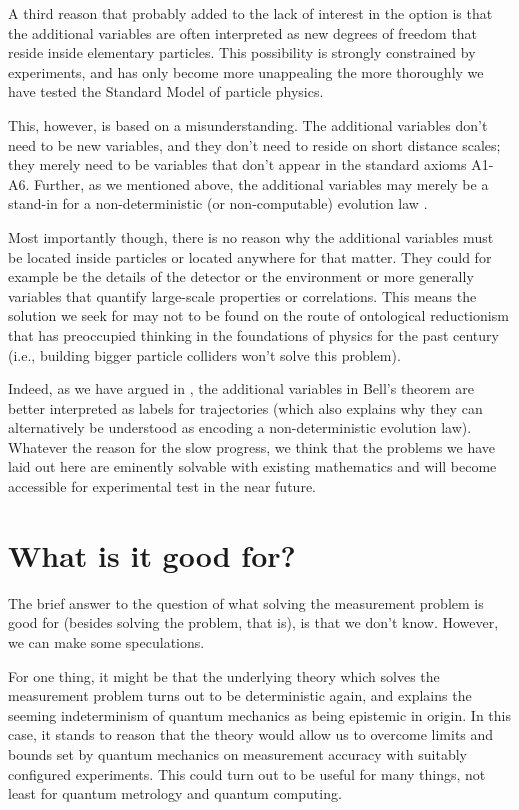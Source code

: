 \documentclass[superscriptaddress,floatfix,nofootinbib,12pt]{revtex4-2}
\begin{document}
A third reason that probably added to the lack of interest in the option is that the additional variables are often interpreted as new degrees of freedom that reside inside elementary particles. This possibility is strongly constrained by experiments, and has only become more unappealing the more thoroughly we have tested the Standard Model of particle physics.

This, however, is based on a misunderstanding. The additional variables don't need to be new variables, and they don't need to reside on short distance scales; they merely need to be variables that don't appear in the standard axioms A1-A6. Further, as we mentioned above, the additional variables may merely be a stand-in for a non-deterministic (or non-computable) evolution law \cite{Hance2021StatInd}. 

Most importantly though, there is no reason why the additional variables must be located inside particles or located anywhere for that matter.
They could for example be the details of the detector or the environment or more generally variables that quantify large-scale properties or correlations. This means the solution we seek for may not to be found on the route of ontological reductionism that has preoccupied thinking in the foundations of physics for the past century (i.e., building bigger particle colliders won't solve this problem).

Indeed, as we have argued in \cite{Hance2021Ensemble}, the additional variables in Bell's theorem are better interpreted as labels for trajectories (which also explains why they can alternatively be understood as encoding a non-deterministic evolution law). 
Whatever the reason for the slow progress, we think that the problems we have laid out here are eminently solvable with existing mathematics and will become accessible for experimental test in the near future. 

\section{What is it good for?}

The brief answer to the question of what solving the measurement problem is good for (besides solving the problem, that is), is that we don't know. However, we can make some speculations.

For one thing, it might be that the underlying theory which solves the measurement problem turns out to be deterministic again, and explains the seeming indeterminism of quantum mechanics as being epistemic in origin. In this case, it stands to reason that the theory would allow us to overcome limits and bounds set by quantum mechanics on measurement accuracy with suitably configured experiments. 
This could turn out to be useful for many things, not least for quantum metrology and quantum computing. 
\end{document}
